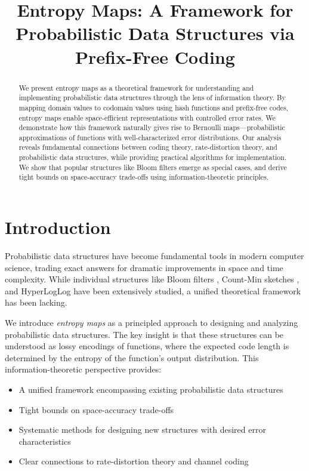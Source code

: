 \documentclass[11pt]{article}
\title{Entropy Maps: A Framework for Probabilistic Data Structures via Prefix-Free Coding}
\author{}
\date{}
\begin{document}
\maketitle

\begin{abstract}
We present entropy maps as a theoretical framework for understanding and implementing probabilistic data structures through the lens of information theory. By mapping domain values to codomain values using hash functions and prefix-free codes, entropy maps enable space-efficient representations with controlled error rates. We demonstrate how this framework naturally gives rise to Bernoulli maps---probabilistic approximations of functions with well-characterized error distributions. Our analysis reveals fundamental connections between coding theory, rate-distortion theory, and probabilistic data structures, while providing practical algorithms for implementation. We show that popular structures like Bloom filters emerge as special cases, and derive tight bounds on space-accuracy trade-offs using information-theoretic principles.
\end{abstract}

\section{Introduction}

Probabilistic data structures have become fundamental tools in modern computer science, trading exact answers for dramatic improvements in space and time complexity. While individual structures like Bloom filters \cite{bloom1970}, Count-Min sketches \cite{cormode2005}, and HyperLogLog \cite{flajolet2007} have been extensively studied, a unified theoretical framework has been lacking.

We introduce \emph{entropy maps} as a principled approach to designing and analyzing probabilistic data structures. The key insight is that these structures can be understood as lossy encodings of functions, where the expected code length is determined by the entropy of the function's output distribution. This information-theoretic perspective provides:
\begin{itemize}
\item A unified framework encompassing existing probabilistic data structures
\item Tight bounds on space-accuracy trade-offs
\item Systematic methods for designing new structures with desired error characteristics
\item Clear connections to rate-distortion theory and channel coding
\end{itemize}
\end{document}
